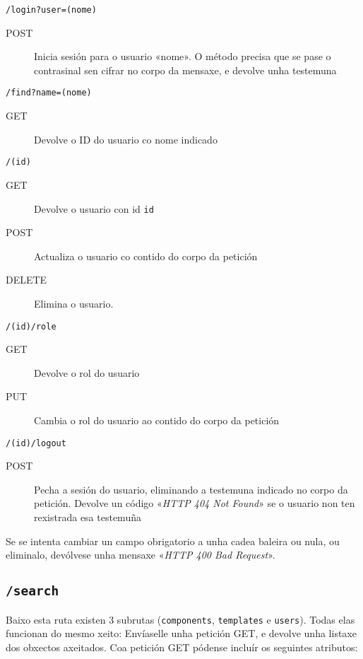 \texttt{/login?user=(nome)}

\begin{description}
    \item[POST] Inicia sesión para o usuario «nome». O método precisa que se pase o contrasinal sen cifrar no corpo da mensaxe, e devolve unha \Gls{testemuna}
\end{description}

\texttt{/find?name=(nome)}

\begin{description}
    \item[GET] Devolve o ID do usuario co nome indicado
\end{description}

\texttt{/(id)}

\begin{description}
    \item[GET] Devolve o usuario con id \texttt{id}
    \item[POST] Actualiza o usuario co contido do corpo da petición
    \item[DELETE] Elimina o usuario.
\end{description}

\texttt{/(id)/role}

\begin{description}
    \item[GET] Devolve o rol do usuario
    \item[PUT] Cambia o rol do usuario ao contido do corpo da petición
\end{description}

\texttt{/(id)/logout}

\begin{description}
    \item[POST] Pecha a sesión do usuario, eliminando a \Gls{testemuna} indicado no corpo da petición. Devolve un código «\textit{HTTP 404 Not Found}» se o usuario non ten rexistrada esa testemuña
\end{description}

Se se intenta cambiar un campo obrigatorio a unha cadea baleira ou nula, ou eliminalo, devólvese unha mensaxe «\textit{HTTP 400 Bad Request}».

\subsection{\texttt{/search}}

Baixo esta ruta existen 3 subrutas (\texttt{components}, \texttt{templates} e \texttt{users}). Todas elas funcionan do mesmo xeito: Envíaselle unha petición GET, e devolve unha listaxe dos obxectos axeitados. Coa petición GET pódense incluír os seguintes atributos:

